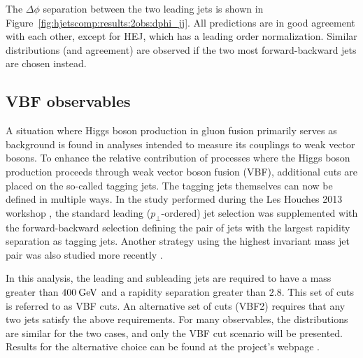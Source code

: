 The $\Delta\phi$ separation between the two leading jets is shown in
Figure~\ref{fig:hjetscomp:results:2obs:dphi_jj}. All predictions are
in good agreement with each other, except for HEJ, which has a leading
order normalization. Similar distributions (and agreement) are
observed if the two most forward-backward jets are chosen instead.



\clearpage
\subsection{VBF observables}
\label{sec:hjetscomp:results:VBFobs}

A situation where Higgs boson production in gluon fusion primarily
serves as background is found in analyses intended to measure its
couplings to weak vector bosons. To enhance the relative contribution
of processes where the Higgs boson production proceeds through weak
vector boson fusion (VBF), additional cuts are placed on the so-called
tagging jets. The tagging jets themselves can now be defined in
multiple ways. In the study performed during the Les Houches 2013
workshop \cite{AlcarazMaestre:2012vp}, the standard leading
($p_\perp$-ordered) jet selection was supplemented with the
forward-backward selection defining the pair of jets with the largest
rapidity separation as tagging jets. Another strategy using the
highest invariant mass jet pair was also studied more recently
\cite{Greiner:2015jha}.


In this analysis, the leading and subleading jets are required to have
a mass greater than $400\text{\:GeV}$ and a rapidity separation greater than
$2.8$. This set of cuts is referred to as VBF cuts. An alternative set
of cuts (VBF2) requires that any two jets satisfy the above
requirements. For many observables, the distributions are similar for
the two cases, and only the VBF cut scenario will be presented.
Results for the alternative choice can be found at the project's
webpage \cite{webpage}.

